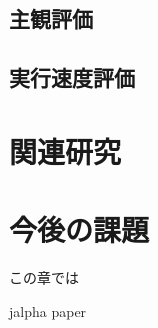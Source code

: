 \documentclass[a4j,12pt]{jreport}
\begin{document}
\section{主観評価}
\section{実行速度評価}


\chapter{関連研究}


\chapter{今後の課題}
この章では


 {jalpha}
 {paper}
\end{document}
